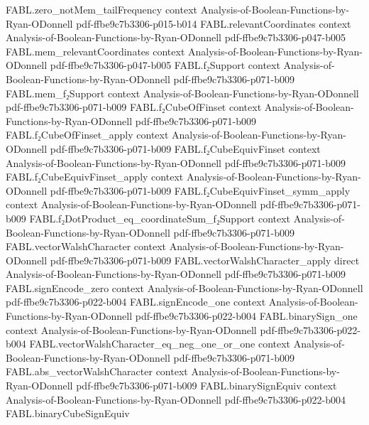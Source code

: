 \begin{theorem}
\proofstep
  {FABL.zero_notMem_tailFrequency}
  {context}
  {Analysis-of-Boolean-Functions-by-Ryan-ODonnell}
  {pdf-ffbe9c7b3306-p015-b014}
\proofstep
  {FABL.relevantCoordinates}
  {context}
  {Analysis-of-Boolean-Functions-by-Ryan-ODonnell}
  {pdf-ffbe9c7b3306-p047-b005}
\proofstep
  {FABL.mem_relevantCoordinates}
  {context}
  {Analysis-of-Boolean-Functions-by-Ryan-ODonnell}
  {pdf-ffbe9c7b3306-p047-b005}
\proofstep
  {FABL.f₂Support}
  {context}
  {Analysis-of-Boolean-Functions-by-Ryan-ODonnell}
  {pdf-ffbe9c7b3306-p071-b009}
\proofstep
  {FABL.mem_f₂Support}
  {context}
  {Analysis-of-Boolean-Functions-by-Ryan-ODonnell}
  {pdf-ffbe9c7b3306-p071-b009}
\proofstep
  {FABL.f₂CubeOfFinset}
  {context}
  {Analysis-of-Boolean-Functions-by-Ryan-ODonnell}
  {pdf-ffbe9c7b3306-p071-b009}
\proofstep
  {FABL.f₂CubeOfFinset_apply}
  {context}
  {Analysis-of-Boolean-Functions-by-Ryan-ODonnell}
  {pdf-ffbe9c7b3306-p071-b009}
\proofstep
  {FABL.f₂CubeEquivFinset}
  {context}
  {Analysis-of-Boolean-Functions-by-Ryan-ODonnell}
  {pdf-ffbe9c7b3306-p071-b009}
\proofstep
  {FABL.f₂CubeEquivFinset_apply}
  {context}
  {Analysis-of-Boolean-Functions-by-Ryan-ODonnell}
  {pdf-ffbe9c7b3306-p071-b009}
\proofstep
  {FABL.f₂CubeEquivFinset_symm_apply}
  {context}
  {Analysis-of-Boolean-Functions-by-Ryan-ODonnell}
  {pdf-ffbe9c7b3306-p071-b009}
\proofstep
  {FABL.f₂DotProduct_eq_coordinateSum_f₂Support}
  {context}
  {Analysis-of-Boolean-Functions-by-Ryan-ODonnell}
  {pdf-ffbe9c7b3306-p071-b009}
\proofstep
  {FABL.vectorWalshCharacter}
  {context}
  {Analysis-of-Boolean-Functions-by-Ryan-ODonnell}
  {pdf-ffbe9c7b3306-p071-b009}
\proofstep
  {FABL.vectorWalshCharacter_apply}
  {direct}
  {Analysis-of-Boolean-Functions-by-Ryan-ODonnell}
  {pdf-ffbe9c7b3306-p071-b009}
\proofstep
  {FABL.signEncode_zero}
  {context}
  {Analysis-of-Boolean-Functions-by-Ryan-ODonnell}
  {pdf-ffbe9c7b3306-p022-b004}
\proofstep
  {FABL.signEncode_one}
  {context}
  {Analysis-of-Boolean-Functions-by-Ryan-ODonnell}
  {pdf-ffbe9c7b3306-p022-b004}
\proofstep
  {FABL.binarySign_one}
  {context}
  {Analysis-of-Boolean-Functions-by-Ryan-ODonnell}
  {pdf-ffbe9c7b3306-p022-b004}
\proofstep
  {FABL.vectorWalshCharacter_eq_neg_one_or_one}
  {context}
  {Analysis-of-Boolean-Functions-by-Ryan-ODonnell}
  {pdf-ffbe9c7b3306-p071-b009}
\proofstep
  {FABL.abs_vectorWalshCharacter}
  {context}
  {Analysis-of-Boolean-Functions-by-Ryan-ODonnell}
  {pdf-ffbe9c7b3306-p071-b009}
\proofstep
  {FABL.binarySignEquiv}
  {context}
  {Analysis-of-Boolean-Functions-by-Ryan-ODonnell}
  {pdf-ffbe9c7b3306-p022-b004}
\proofstep
  {FABL.binaryCubeSignEquiv}

\end{theorem}
